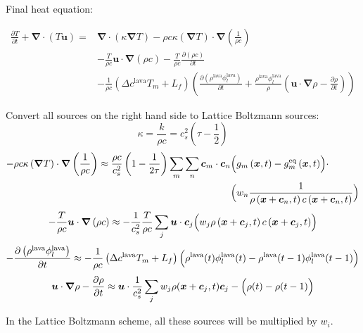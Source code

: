 \clearpage

Final heat equation:

\begin{equation}
\begin{split}
    \frac{\partial T}{\partial t} + \bm{\nabla}\cdot\left(T \bm{u}\right) =& \bm{\nabla}\cdot\left(\kappa \bm{\nabla}T\right)- \rho c \kappa \left(\bm{\nabla}T\right) \cdot\bm{\nabla}\left(\frac{1}{\rho c}\right)\\
    & - \frac{T}{\rho c} \bm{u}\cdot\bm{\nabla}\left(\rho c\right) - \frac{T}{\rho c} \frac{\partial\left(\rho c\right)}{\partial t}\\
    & - \frac{1}{\rho c}\left(\Delta c^{\text{lava}} T_m + L_f\right) \left(\frac{\partial \left(\rho^{\text{lava}}\phi_l^{\text{lava}}\right)}{\partial t} + \frac{\rho^{\text{lava}}\phi_l^{\text{lava}}}{\rho}\left(\bm{u}\cdot \bm{\nabla}\rho - \frac{\partial \rho}{\partial t}\right)\right)
\end{split}
\end{equation}

Convert all sources on the right hand side to Lattice Boltzmann sources:
\begin{equation}
    \kappa = \frac{k}{\rho c} = c_s^2 \left(\tau - \frac{1}{2}\right) 
\end{equation}
\begin{equation}
\begin{split}
    -\rho c \kappa \left(\bm{\nabla}T\right)\cdot\bm{\nabla}\left(\frac{1}{\rho c}\right) \approx \frac{\rho c}{c_s^2} \left(1 - \frac{1}{2 \tau}\right)\sum_m \sum_n \bm{c}_m\cdot \bm{c}_n&\Bigl(g_m\left(\bm{x}, t\right) - g_m^{\text{eq}}\left(\bm{x}, t\right)\Bigr)\cdot\\
    &\Bigl(w_n \frac{1}{\rho\left(\bm{x} + \bm{c}_n, t\right) c\left(\bm{x} + \bm{c}_n, t\right)}\Bigr)
\end{split}
\end{equation}
\begin{equation}
    - \frac{T}{\rho c} \bm{u}\cdot\bm{\nabla}\left(\rho c\right) \approx - \frac{1}{c_s^2}\frac{T}{\rho c} \sum_j \bm{u}\cdot \bm{c}_j\Bigl( w_j \rho\left(\bm{x} + \bm{c}_j, t\right) c\left(\bm{x} + \bm{c}_j, t\right)\Bigr) 
\end{equation}
\begin{equation}
    - \frac{\partial \left(\rho^{\text{lava}}\phi_l^{\text{lava}}\right)}{\partial t} \approx - \frac{1}{\rho c}\left(\Delta c^{\text{lava}} T_m + L_f\right)\Bigl(\rho^{\text{lava}}(t)\phi_l^{\text{lava}}(t) - \rho^{\text{lava}}(t-1)\phi_l^{\text{lava}}(t-1)\Bigr)
\end{equation}
\begin{equation}
    \bm{u}\cdot \bm{\nabla}\rho - \frac{\partial \rho}{\partial t} \approx \bm{u} \cdot \frac{1}{c_s^2}\sum_j w_j \rho(\bm{x} + \bm{c}_j, t)\bm{c}_j - \Bigl(\rho(t) - \rho(t-1)\Bigr)
\end{equation}

In the Lattice Boltzmann scheme, all these sources will be multiplied by $w_i$.
